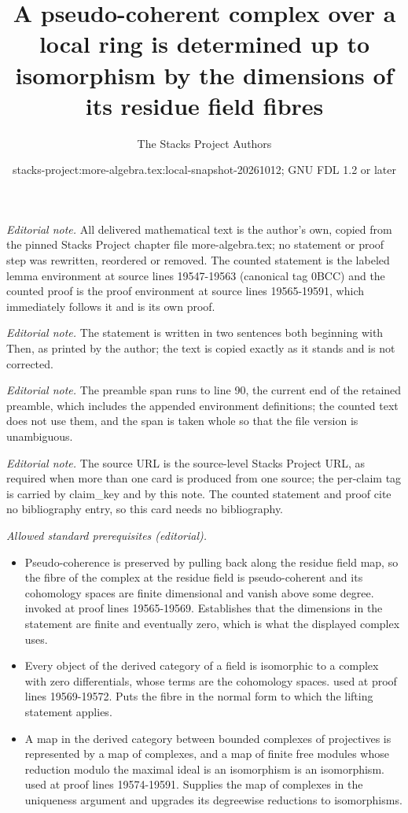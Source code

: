 \documentclass[10pt,a4paper]{amsart}
\title{A pseudo-coherent complex over a local ring is determined up to isomorphism by the dimensions of its residue field fibres}
\author{The Stacks Project Authors}
\date{stacks-project:more-algebra.tex:local-snapshot-20261012; GNU FDL 1.2 or later}
\theoremstyle{plain}
\theoremstyle{definition}
\theoremstyle{remark}
\numberwithin{equation}{subsection}
\begin{document}
\maketitle
\setcounter{subsection}{1}
\noindent\textit{Editorial note.} All delivered mathematical text is the author's own, copied from the pinned Stacks Project chapter file more-algebra.tex; no statement or proof step was rewritten, reordered or removed. The counted statement is the labeled lemma environment at source lines 19547-19563 (canonical tag 0BCC) and the counted proof is the proof environment at source lines 19565-19591, which immediately follows it and is its own proof.\par\medskip
\noindent\textit{Editorial note.} The statement is written in two sentences both beginning with Then, as printed by the author; the text is copied exactly as it stands and is not corrected.\par\medskip
\noindent\textit{Editorial note.} The preamble span runs to line 90, the current end of the retained preamble, which includes the appended environment definitions; the counted text does not use them, and the span is taken whole so that the file version is unambiguous.\par\medskip
\noindent\textit{Editorial note.} The source URL is the source-level Stacks Project URL, as required when more than one card is produced from one source; the per-claim tag is carried by claim\_key and by this note. The counted statement and proof cite no bibliography entry, so this card needs no bibliography.\par\medskip
\noindent\textit{Allowed standard prerequisites (editorial).}\begin{itemize}
\item Pseudo-coherence is preserved by pulling back along the residue field map, so the fibre of the complex at the residue field is pseudo-coherent and its cohomology spaces are finite dimensional and vanish above some degree. invoked at proof lines 19565-19569. Establishes that the dimensions in the statement are finite and eventually zero, which is what the displayed complex uses.
\item Every object of the derived category of a field is isomorphic to a complex with zero differentials, whose terms are the cohomology spaces. used at proof lines 19569-19572. Puts the fibre in the normal form to which the lifting statement applies.
\item A map in the derived category between bounded complexes of projectives is represented by a map of complexes, and a map of finite free modules whose reduction modulo the maximal ideal is an isomorphism is an isomorphism. used at proof lines 19574-19591. Supplies the map of complexes in the uniqueness argument and upgrades its degreewise reductions to isomorphisms.
\end{itemize}\medskip
\end{document}
